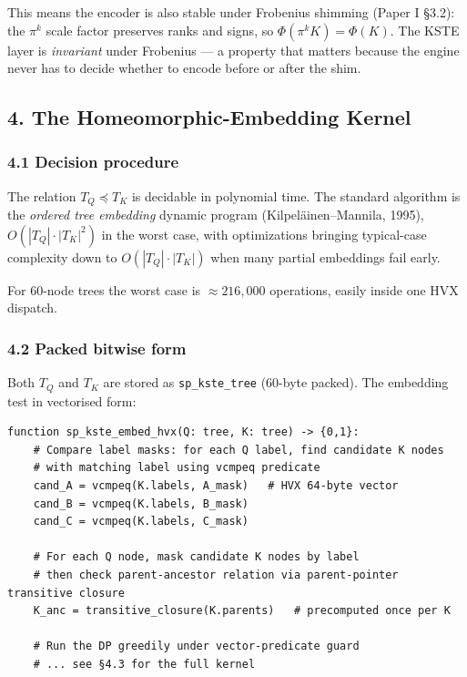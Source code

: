 \documentclass[
  11pt,
]{article}
\begin{document}
This means the encoder is also stable under Frobenius shimming (Paper I
§3.2): the \(\pi^k\) scale factor preserves ranks and signs, so
\(\Phi(\pi^k K) = \Phi(K)\). The KSTE layer is \emph{invariant} under
Frobenius --- a property that matters because the engine never has to
decide whether to encode before or after the shim.

\hypertarget{the-homeomorphic-embedding-kernel}{%
\subsection{4. The Homeomorphic-Embedding
Kernel}\label{the-homeomorphic-embedding-kernel}}

\hypertarget{decision-procedure}{%
\subsubsection{4.1 Decision procedure}\label{decision-procedure}}

The relation \(T_Q \preceq T_K\) is decidable in polynomial time. The
standard algorithm is the \emph{ordered tree embedding} dynamic program
(Kilpeläinen--Mannila, 1995), \(O(|T_Q| \cdot |T_K|^2)\) in the worst
case, with optimizations bringing typical-case complexity down to
\(O(|T_Q| \cdot |T_K|)\) when many partial embeddings fail early.

For 60-node trees the worst case is \(\approx 216{,}000\) operations,
easily inside one HVX dispatch.

\hypertarget{packed-bitwise-form}{%
\subsubsection{4.2 Packed bitwise form}\label{packed-bitwise-form}}

Both \(T_Q\) and \(T_K\) are stored as \texttt{sp\_kste\_tree} (60-byte
packed). The embedding test in vectorised form:

\begin{verbatim}
function sp_kste_embed_hvx(Q: tree, K: tree) -> {0,1}:
    # Compare label masks: for each Q label, find candidate K nodes
    # with matching label using vcmpeq predicate
    cand_A = vcmpeq(K.labels, A_mask)   # HVX 64-byte vector
    cand_B = vcmpeq(K.labels, B_mask)
    cand_C = vcmpeq(K.labels, C_mask)

    # For each Q node, mask candidate K nodes by label
    # then check parent-ancestor relation via parent-pointer transitive closure
    K_anc = transitive_closure(K.parents)   # precomputed once per K

    # Run the DP greedily under vector-predicate guard
    # ... see §4.3 for the full kernel
\end{verbatim}
\end{document}
